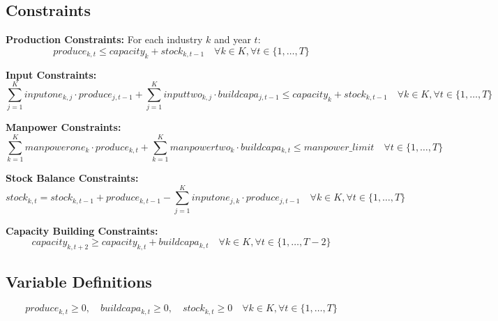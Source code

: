 \documentclass{article}
\begin{document}
\subsection*{Constraints}

\textbf{Production Constraints:}
For each industry $k$ and year $t$:
\[
produce_{k,t} \leq capacity_{k} + stock_{k,t-1} \quad \forall k \in K, \forall t \in \{1, \ldots, T\}
\]

\textbf{Input Constraints:}
\[
\sum_{j=1}^{K} inputone_{k,j} \cdot produce_{j,t-1} + \sum_{j=1}^{K} inputtwo_{k,j} \cdot buildcapa_{j,t-1} \leq capacity_{k} + stock_{k,t-1} \quad \forall k \in K, \forall t \in \{1, \ldots, T\}
\]

\textbf{Manpower Constraints:}
\[
\sum_{k=1}^{K} manpowerone_{k} \cdot produce_{k,t} + \sum_{k=1}^{K} manpowertwo_{k} \cdot buildcapa_{k,t} \leq manpower\_limit \quad \forall t \in \{1, \ldots, T\}
\]

\textbf{Stock Balance Constraints:}
\[
stock_{k,t} = stock_{k,t-1} + produce_{k,t-1} - \sum_{j=1}^{K} inputone_{j,k} \cdot produce_{j,t-1} \quad \forall k \in K, \forall t \in \{1, \ldots, T\}
\]

\textbf{Capacity Building Constraints:}
\[
capacity_{k,t+2} \geq capacity_{k,t} + buildcapa_{k,t} \quad \forall k \in K, \forall t \in \{1, \ldots, T-2\}
\]

\subsection*{Variable Definitions}
\[
produce_{k,t} \geq 0,\quad buildcapa_{k,t} \geq 0,\quad stock_{k,t} \geq 0 \quad \forall k \in K, \forall t \in \{1, \ldots, T\}
\]
\end{document}
